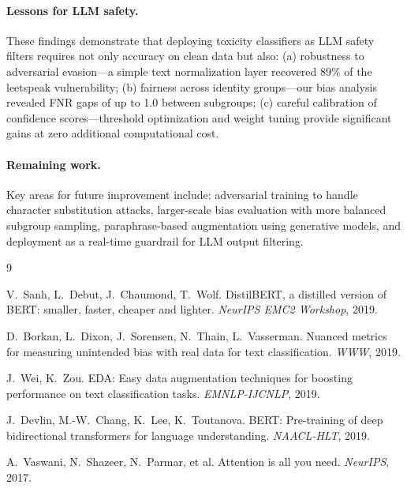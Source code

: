 \documentclass[11pt,a4paper]{article}
\begin{document}
\paragraph{Lessons for LLM safety.}
These findings demonstrate that deploying toxicity classifiers as LLM safety filters requires not only accuracy on clean data but also:
(a) robustness to adversarial evasion---a simple text normalization layer recovered 89\% of the leetspeak vulnerability;
(b) fairness across identity groups---our bias analysis revealed FNR gaps of up to 1.0 between subgroups;
(c) careful calibration of confidence scores---threshold optimization and weight tuning provide significant gains at zero additional computational cost.

\paragraph{Remaining work.}
Key areas for future improvement include: adversarial training to handle character substitution attacks, larger-scale bias evaluation with more balanced subgroup sampling, paraphrase-based augmentation using generative models, and deployment as a real-time guardrail for LLM output filtering.


\begin{thebibliography}{9}

V.~Sanh, L.~Debut, J.~Chaumond, T.~Wolf.
\newblock DistilBERT, a distilled version of BERT: smaller, faster, cheaper and lighter.
\newblock \emph{NeurIPS EMC2 Workshop}, 2019.

D.~Borkan, L.~Dixon, J.~Sorensen, N.~Thain, L.~Vasserman.
\newblock Nuanced metrics for measuring unintended bias with real data for text classification.
\newblock \emph{WWW}, 2019.

J.~Wei, K.~Zou.
\newblock EDA: Easy data augmentation techniques for boosting performance on text classification tasks.
\newblock \emph{EMNLP-IJCNLP}, 2019.

J.~Devlin, M.-W.~Chang, K.~Lee, K.~Toutanova.
\newblock BERT: Pre-training of deep bidirectional transformers for language understanding.
\newblock \emph{NAACL-HLT}, 2019.

A.~Vaswani, N.~Shazeer, N.~Parmar, et al.
\newblock Attention is all you need.
\newblock \emph{NeurIPS}, 2017.

\end{thebibliography}
\end{document}
